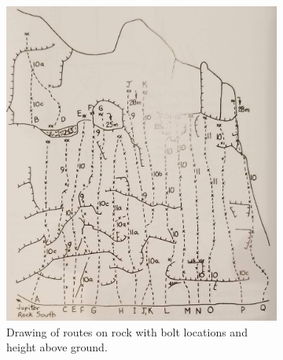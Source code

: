\documentclass[10pt]{article}
\begin{document}
\begin{figure}[!htb]
\begin{subfigure}[b]{0.3\textwidth}
    \includegraphics[width=\textwidth]{jupiter_rock_drawing.jpg}
    \caption{Drawing of routes on rock with bolt locations and height above ground.}
    \label{fig:route_drawing}
  \end{subfigure}
  \hfill
  \begin{subfigure}[b]{0.3\textwidth}
    \centering

\end{subfigure}
\end{figure}
\end{document}
